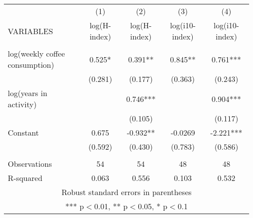 \documentclass[]{article}
\begin{document}
\begin{tabular}{lcccc} \hline
 & (1) & (2) & (3) & (4) \\
VARIABLES & log(H-index) & log(H-index) & log(i10-index) & log(i10-index) \\ \hline
 &  &  &  &  \\
log(weekly coffee consumption) & 0.525* & 0.391** & 0.845** & 0.761*** \\
 & (0.281) & (0.177) & (0.363) & (0.243) \\
log(years in activity) &  & 0.746*** &  & 0.904*** \\
 &  & (0.105) &  & (0.117) \\
Constant & 0.675 & -0.932** & -0.0269 & -2.221*** \\
 & (0.592) & (0.430) & (0.783) & (0.586) \\
 &  &  &  &  \\
Observations & 54 & 54 & 48 & 48 \\
 R-squared & 0.063 & 0.556 & 0.103 & 0.532 \\ \hline
\multicolumn{5}{c}{ Robust standard errors in parentheses} \\
\multicolumn{5}{c}{ *** p$<$0.01, ** p$<$0.05, * p$<$0.1} \\
\end{tabular}
\end{document}
